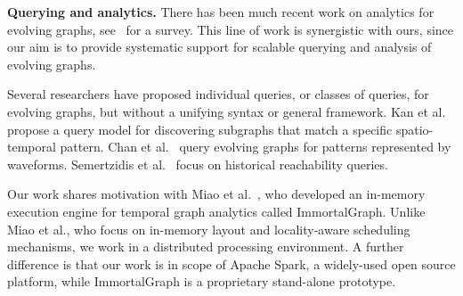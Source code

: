 
{\bf Querying and analytics.} There has been much recent work on
analytics for evolving graphs,
see~\cite{DBLP:journals/csur/AggarwalS14} for a survey. This line of
work is synergistic with ours, since our aim is to provide systematic
support for scalable querying and analysis of evolving graphs.

Several researchers have proposed individual queries, or classes of
queries, for evolving graphs, but without a unifying syntax or general
framework.  Kan et al.~\cite{Kan2009} propose a query model for
discovering subgraphs that match a specific spatio-temporal pattern.
Chan et al.~\cite{Chan2008} query evolving graphs for patterns
represented by waveforms.  Semertzidis et al.~\cite{Semertzidis2015}
focus on historical reachability queries.

Our work shares motivation with Miao et
al.~\cite{DBLP:journals/tos/MiaoHLWYZPCC15}, who developed an
in-memory execution engine for temporal graph analytics called
ImmortalGraph.  Unlike Miao et al., who focus on in-memory layout and
locality-aware scheduling mechanisms, we work in a distributed
processing environment.  A further difference is that our work is in
scope of Apache Spark, a widely-used open source platform, while
ImmortalGraph is a proprietary stand-alone prototype.
